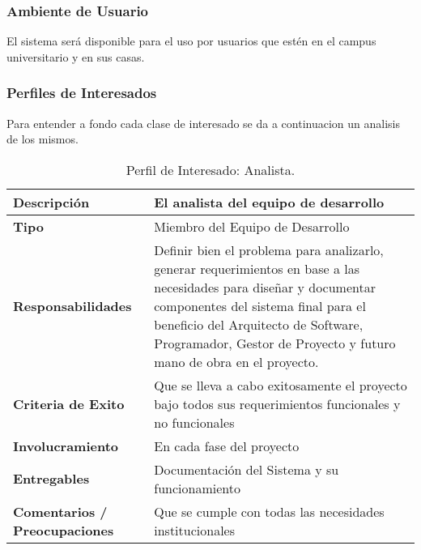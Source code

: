 \subsubsection{Ambiente de Usuario}
El sistema será disponible para el uso por usuarios que estén en el campus universitario y en sus casas.

\subsubsection{Perfiles de Interesados}
Para entender a fondo cada clase de interesado se da a continuacion un analisis de los mismos.

\pagebreak

\begin{table}[h!]
  \begin{tabular}{|p{}|p{}|}
    \hline
    \textbf{Descripción} & El analista del equipo de desarrollo \\
    \hline
    \textbf{Tipo} & Miembro del Equipo de Desarrollo \\
    \hline
    \textbf{Responsabilidades} & Definir bien el problema para analizarlo, generar requerimientos en base a las necesidades para diseñar y documentar componentes del sistema final para el beneficio del Arquitecto de Software, Programador, Gestor de Proyecto y futuro mano de obra en el proyecto. \\
    \hline
    \textbf{Criteria de Exito} & Que se lleva a cabo exitosamente el proyecto bajo todos sus requerimientos funcionales y no funcionales \\
    \hline
    \textbf{Involucramiento} & En cada fase del proyecto \\
    \hline
    \textbf{Entregables} & Documentación del Sistema y su funcionamiento \\
    \hline
    \textbf{Comentarios / Preocupaciones} & Que se cumple con todas las necesidades institucionales \\
    \hline
  \end{tabular}
  \caption{Perfil de Interesado: Analista.}
  \label{per-inter-analista}
\end{table}

\vfill

